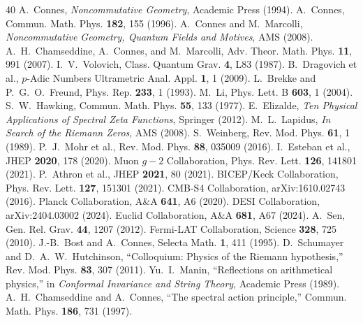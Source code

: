 \documentclass[11pt,a4paper]{article}
\begin{document}
\begin{thebibliography}{40}
 A.~Connes, \emph{Noncommutative Geometry}, Academic Press (1994).
 A.~Connes, Commun. Math. Phys. \textbf{182}, 155 (1996).
 A.~Connes and M.~Marcolli, \emph{Noncommutative Geometry, Quantum Fields and Motives}, AMS (2008).
 A.~H.~Chamseddine, A.~Connes, and M.~Marcolli, Adv. Theor. Math. Phys. \textbf{11}, 991 (2007).
 I.~V.~Volovich, Class. Quantum Grav. \textbf{4}, L83 (1987).
 B.~Dragovich et al., $p$-Adic Numbers Ultrametric Anal. Appl. \textbf{1}, 1 (2009).
 L.~Brekke and P.~G.~O.~Freund, Phys. Rep. \textbf{233}, 1 (1993).
 M.~Li, Phys. Lett. B \textbf{603}, 1 (2004).
 S.~W.~Hawking, Commun. Math. Phys. \textbf{55}, 133 (1977).
 E.~Elizalde, \emph{Ten Physical Applications of Spectral Zeta Functions}, Springer (2012).
 M.~L.~Lapidus, \emph{In Search of the Riemann Zeros}, AMS (2008).
 S.~Weinberg, Rev. Mod. Phys. \textbf{61}, 1 (1989).
 P.~J.~Mohr et al., Rev. Mod. Phys. \textbf{88}, 035009 (2016).
 I.~Esteban et al., JHEP \textbf{2020}, 178 (2020).
 Muon $g-2$ Collaboration, Phys. Rev. Lett. \textbf{126}, 141801 (2021).
 P.~Athron et al., JHEP \textbf{2021}, 80 (2021).
 BICEP/Keck Collaboration, Phys. Rev. Lett. \textbf{127}, 151301 (2021).
 CMB-S4 Collaboration, arXiv:1610.02743 (2016).
 Planck Collaboration, A\&A \textbf{641}, A6 (2020).
 DESI Collaboration, arXiv:2404.03002 (2024).
 Euclid Collaboration, A\&A \textbf{681}, A67 (2024).
 A.~Sen, Gen. Rel. Grav. \textbf{44}, 1207 (2012).
 Fermi-LAT Collaboration, Science \textbf{328}, 725 (2010).
 J.-B.~Bost and A.~Connes, Selecta Math. \textbf{1}, 411 (1995).
 D.~Schumayer and D.~A.~W.~Hutchinson, ``Colloquium: Physics of the Riemann hypothesis,'' Rev. Mod. Phys. \textbf{83}, 307 (2011).
 Yu.~I.~Manin, ``Reflections on arithmetical physics,'' in \emph{Conformal Invariance and String Theory}, Academic Press (1989).
 A.~H.~Chamseddine and A.~Connes, ``The spectral action principle,'' Commun. Math. Phys. \textbf{186}, 731 (1997).
\end{thebibliography}
\end{document}
